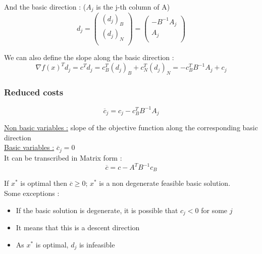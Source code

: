 \documentclass[../main.tex]{subfiles}
\begin{document}
And the basic direction : ($A_j$ is the j-th column of A)\begin{equation}
    d_j = \begin{pmatrix}
        (d_j)_B\\ (d_j)_N\\
    \end{pmatrix} = \begin{pmatrix}
        -B^{-1} A_j\\ A_j\\
    \end{pmatrix}
\end{equation}

We can also define the slope along the basic direction : \begin{equation}
    \nabla f(x)^T d_j = c^T d_j = c_B^T (d_j)_B + c_N^T (d_j)_N = -c_B^T B^{-1}A_j + c_j
\end{equation}

\subsubsection{Reduced costs}
\begin{equation}
    \overline{c}_j = c_j - c_B^T B^{-1}A_j
\end{equation}

\quad \underline{Non basic variables :} slope of the objective function along the corresponding basic direction\\

\quad \underline{Basic variables :} $\overline{c}_j = 0$\\

It can be transcribed in Matrix form : \begin{equation}
    \overline{c} = c-A^T B^{-1} c_B
\end{equation}

\warning If $x^*$ is optimal then $\overline{c} \geq 0$; $x^*$ is a non degenerate feasible basic solution.\\

Some exceptions : \begin{itemize}
    \item If the basic solution is degenerate, it is possible that $c_j<0$ for some $j$\\
    \item It means that this is a descent direction\\
    \item As $x^*$ is optimal, $d_j$ is infeasible\\
\end{itemize}
\end{document}
